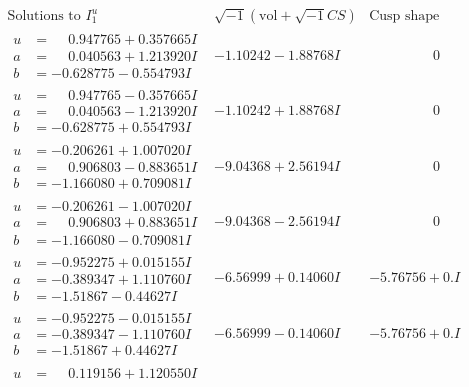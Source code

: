 \documentclass[1p]{elsarticle_modified}
\theoremstyle{definition}
\newcommand{\I}{\sqrt{-1}}
\begin{document}
$$\begin{array}{c|c|c}  
\text{Solutions to }I^u_{1}& \I (\text{vol} + \sqrt{-1}CS) & \text{Cusp shape}\\
 \hline 
\begin{aligned}
u &= \phantom{-}0.947765 + 0.357665 I \\
a &= \phantom{-}0.040563 + 1.213920 I \\
b &= -0.628775 - 0.554793 I\end{aligned}
 & -1.10242 - 1.88768 I & \phantom{-0.000000 } 0 \\ \hline\begin{aligned}
u &= \phantom{-}0.947765 - 0.357665 I \\
a &= \phantom{-}0.040563 - 1.213920 I \\
b &= -0.628775 + 0.554793 I\end{aligned}
 & -1.10242 + 1.88768 I & \phantom{-0.000000 } 0 \\ \hline\begin{aligned}
u &= -0.206261 + 1.007020 I \\
a &= \phantom{-}0.906803 - 0.883651 I \\
b &= -1.166080 + 0.709081 I\end{aligned}
 & -9.04368 + 2.56194 I & \phantom{-0.000000 } 0 \\ \hline\begin{aligned}
u &= -0.206261 - 1.007020 I \\
a &= \phantom{-}0.906803 + 0.883651 I \\
b &= -1.166080 - 0.709081 I\end{aligned}
 & -9.04368 - 2.56194 I & \phantom{-0.000000 } 0 \\ \hline\begin{aligned}
u &= -0.952275 + 0.015155 I \\
a &= -0.389347 + 1.110760 I \\
b &= -1.51867 - 0.44627 I\end{aligned}
 & -6.56999 + 0.14060 I & -5.76756 + 0. I\phantom{ +0.000000I} \\ \hline\begin{aligned}
u &= -0.952275 - 0.015155 I \\
a &= -0.389347 - 1.110760 I \\
b &= -1.51867 + 0.44627 I\end{aligned}
 & -6.56999 - 0.14060 I & -5.76756 + 0. I\phantom{ +0.000000I} \\ \hline\begin{aligned}
u &= \phantom{-}0.119156 + 1.120550 I \\

\end{aligned}
\end{array}$$
\end{document}
